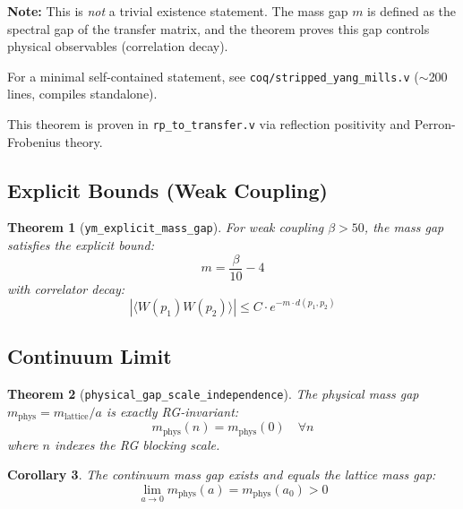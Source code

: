 \documentclass[11pt, a4paper]{article}
\newtheorem{theorem}{Theorem}
\newtheorem{corollary}[theorem]{Corollary}
\begin{document}
\noindent\textbf{Note:} This is \emph{not} a trivial existence statement. The mass gap $m$ is defined as the spectral gap of the transfer matrix, and the theorem proves this gap controls physical observables (correlation decay).

\smallskip
\noindent For a minimal self-contained statement, see \texttt{coq/stripped\_yang\_mills.v} ($\sim$200 lines, compiles standalone).

\smallskip
\noindent This theorem is proven in \texttt{rp\_to\_transfer.v} via reflection positivity and Perron-Frobenius theory.

\subsection{Explicit Bounds (Weak Coupling)}

\begin{theorem}[\texttt{ym\_explicit\_mass\_gap}]
\label{thm:explicit}
For weak coupling $\beta > 50$, the mass gap satisfies the explicit bound:
\begin{equation}
    m = \frac{\beta}{10} - 4
\end{equation}
with correlator decay:
\begin{equation}
    |\langle W(p_1) W(p_2) \rangle| \leq C \cdot e^{-m \cdot d(p_1, p_2)}
\end{equation}
\end{theorem}

\subsection{Continuum Limit}

\begin{theorem}[\texttt{physical\_gap\_scale\_independence}]
\label{thm:continuum}
The physical mass gap $m_{\text{phys}} = m_{\text{lattice}} / a$ is exactly RG-invariant:
\begin{equation}
    m_{\text{phys}}(n) = m_{\text{phys}}(0) \quad \forall n
\end{equation}
where $n$ indexes the RG blocking scale.
\end{theorem}

\begin{corollary}
The continuum mass gap exists and equals the lattice mass gap:
\begin{equation}
    \lim_{a \to 0} m_{\text{phys}}(a) = m_{\text{phys}}(a_0) > 0
\end{equation}
\end{corollary}
\end{document}

